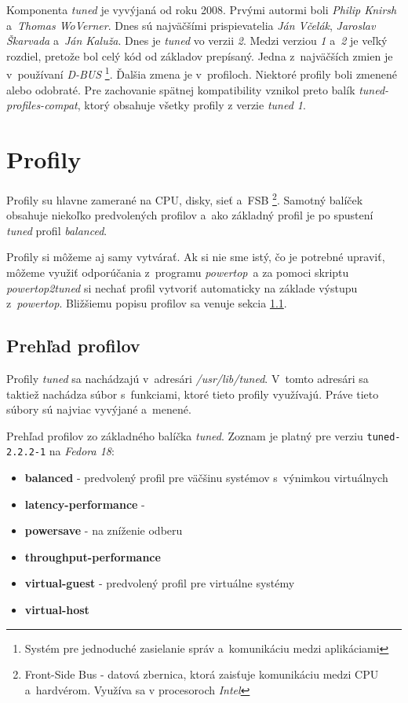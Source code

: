 Komponenta \emph{tuned} je vyvýjaná od roku 2008. Prvými autormi boli
\emph{Philip Knirsh} a~\emph{Thomas WoVerner}. Dnes sú najväčšími
prispievatelia \emph{Ján Včelák}, \emph{Jaroslav Škarvada} a~\emph{Ján Kaluža}.
Dnes je \emph{tuned} vo verzii \emph{2}. Medzi verziou \emph{1} a~\emph{2} je
veľký rozdiel, pretože bol celý kód od základov prepísaný. Jedna z~najväčších
zmien je v~používaní \emph{D-BUS} \footnote{Systém pre jednoduché zasielanie
správ a~komunikáciu medzi aplikáciami}. Ďalšia zmena je v~profiloch. Niektoré
profily boli zmenené alebo odobraté. Pre zachovanie spätnej kompatibility
vznikol preto balík \emph{tuned-profiles-compat}, ktorý obsahuje všetky profily
z verzie \emph{tuned 1}.

%
%

\section{Profily}

Profily su hlavne zamerané na CPU, disky, sieť a~FSB \footnote{Front-Side Bus -
datová zbernica, ktorá zaisťuje komunikáciu medzi CPU a~hardvérom. Využíva sa v
procesoroch \emph{Intel}}. Samotný balíček obsahuje niekoľko predvolených
profilov a~ako základný profil je po spustení \emph{tuned} profil \emph{balanced}.

Profily si môžeme aj samy vytvárať. Ak si nie sme istý, čo je potrebné upraviť,
môžeme využiť odporúčania z~programu \emph{powertop}\cite{powertopHomepage}~a
za pomoci skriptu \emph{powertop2tuned} si nechať profil vytvoriť automaticky
na základe výstupu z~\emph{powertop}. Bližšiemu popisu profilov sa venuje
sekcia \ref{sec:prehladProfilov}. 


%
%

\subsection{Prehľad profilov}
\label{sec:prehladProfilov}

Profily \emph{tuned} sa nachádzajú v~adresári \emph{/usr/lib/tuned}. V~tomto
adresári sa taktiež nachádza súbor s~funkciami, ktoré tieto profily využívajú.
Práve tieto súbory sú najviac vyvýjané a~menené.

Prehľad profilov zo základného balíčka \emph{tuned}. Zoznam je platný pre
verziu \texttt{tuned-2.2.2-1} na \emph{Fedora 18}:

\begin{itemize}
    \item \textbf{balanced} - predvolený profil pre väčšinu systémov s~výnimkou virtuálnych
    \item \textbf{latency-performance} - %
    \item \textbf{powersave} - na zníženie odberu
    \item \textbf{throughput-performance} %
    \item \textbf{virtual-guest} - predvolený profil pre virtuálne systémy
    \item \textbf{virtual-host} %
\end{itemize}

